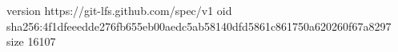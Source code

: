 version https://git-lfs.github.com/spec/v1
oid sha256:4f1dfeeedde276fb655eb00aedc5ab58140dfd5861c861750a620260f67a8297
size 16107
